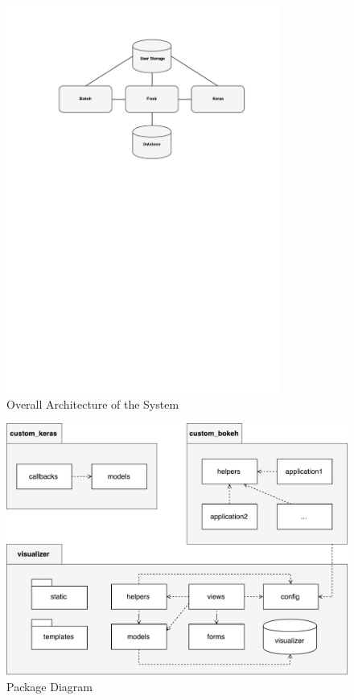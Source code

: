 

\begin{figure}[h!]
    \centering
        \includegraphics[width=0.8\textwidth]{fig/overall-architecture.pdf}
        \caption{Overall Architecture of the System}
        \label{architecture1}
\end{figure}

\begin{figure}[h!]
    \centering
        \includegraphics[width=\textwidth]{fig/package-diagram.pdf}
        \caption{Package Diagram}
        \label{architecture2}
\end{figure}

